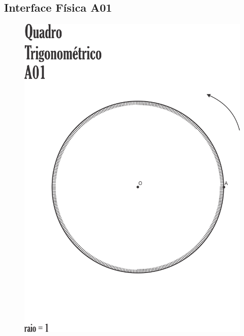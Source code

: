 \subsection{Interface Física A01}\label{subsection:atividade3_A01}
\begin{figure}[htb]
	\centering
	\includegraphics[width=0.9\linewidth]{chapters/appendixLesson/Interface_A01.png}
\end{figure}
\clearpage

